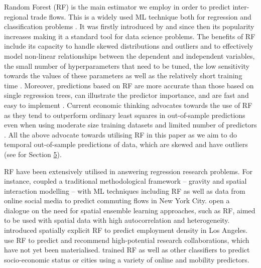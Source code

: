 \documentclass[]{interact}
\theoremstyle{plain}%
\theoremstyle{definition}
\theoremstyle{remark}
\begin{document}
Random Forest (RF) is the main estimator we employ in order to predict
inter-regional trade flows. This is a widely used ML technique both for
regression and classification problems \citep{biau2012analysis}. It was
firstly introduced by \citet{breiman2001random} and since then its
popularity increases making it a standard tool for data science
problems. The benefits of RF include its capacity to handle skewed
distributions and outliers and to effectively model non-linear
relationships between the dependent and independent variables, the small
number of hyperparameters that need to be tuned, the low sensitivity
towards the values of these parameters as well as the relatively short
training time \citep{Caruana2008, liaw2002classification, yan2020using}.
Moreover, predictions based on RF are more accurate than those based on
single regression trees, can illustrate the predictor importance, and
are fast and easy to implement
\citep{breiman2001random, sulaiman2011intelligent, pourebrahim2019trip, biau2012analysis}.
Current economic thinking advocates towards the use of RF as they tend
to outperform ordinary least squares in out-of-sample predictions even
when using moderate size training datasets and limited number of
predictors \citep{mullainathan2017machine, athey2019machine}. All the
above advocate towards utilising RF in this paper as we aim to do
temporal out-of-sample predictions of data, which are skewed and have
outliers (see for Section \protect\hyperlink{sec:5}{5}).

RF have been extensively utilised in answering regression research
problems. For instance, \citet{pourebrahim2019trip} coupled a
traditional methodological framework -- gravity and spatial interaction
modelling -- with ML techniques including RF as well as data from online
social media to predict commuting flows in New York City.
\citet{sinha2019assessing} open a dialogue on the need for spatial
ensemble learning approaches, such as RF, aimed to be used with spatial
data with high autocorrelation and heterogeneity. \citet{creditspatial}
introduced spatially explicit RF to predict employment density in Los
Angeles. \citet{guns2014recommending} use RF to predict and recommend
high-potential research collaborations, which have not yet been
materialised. \citet{ren2019predicting} trained RF as well as other
classifiers to predict socio-economic status or cities using a variety
of online and mobility predictors.
\end{document}
